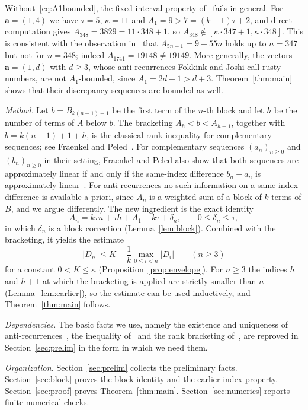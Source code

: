 \documentclass{amsart}
\theoremstyle{definition}
\theoremstyle{remark}
\numberwithin{equation}{section}
\numberwithin{table}{section}
\newcommand{\ba}{\mathbf{a}}
\begin{document}
Without~\eqref{eq:A1bounded}, the fixed-interval property of~\cite[Lemma~5]{FJ} fails in general. For $\ba=(1,4)$ we have $\tau=5$, $\kappa=11$ and $A_1=9>7=(k-1)\tau+2$, and direct computation gives $A_{348}=3829=11\cdot348+1$, so $A_{348}\notin[\kappa\cdot 347+1,\kappa\cdot348]$. This is consistent with the observation in~\cite[Section~5]{FJ} that $A_{5n+1}=9+55n$ holds up to $n=347$ but not for $n=348$; indeed $A_{1741}=19148\ne19149$. More generally, the vectors $\ba=(1,d)$ with $d\ge3$, whose anti-recurrences Fokkink and Joshi call rusty numbers, are not $A_1$-bounded, since $A_1=2d+1>d+3$. Theorem~\ref{thm:main} shows that their discrepancy sequences are bounded as well.

\emph{Method.} Let $b=B_{k(n-1)+1}$ be the first term of the $n$-th block and let $h$ be the number of terms of $A$ below $b$. The bracketing $A_h<b<A_{h+1}$, together with $b=k(n-1)+1+h$, is the classical rank inequality for complementary sequences; see Fraenkel and Peled~\cite[Theorem~3.2]{FP}. For complementary sequences $(a_n)_{n\ge0}$ and $(b_n)_{n\ge0}$ in their setting, Fraenkel and Peled also show that both sequences are approximately linear if and only if the same-index difference $b_n-a_n$ is approximately linear~\cite[Theorem~4.3]{FP}. For anti-recurrences no such information on a same-index difference is available a priori, since $A_n$ is a weighted sum of a block of $k$ terms of $B$, and we argue differently. The new ingredient is the exact identity
\[
A_n=k\tau n+\tau h+A_1-k\tau+\delta_n,\qquad 0\le\delta_n\le\tau,
\]
in which $\delta_n$ is a block correction (Lemma~\ref{lem:block}). Combined with the bracketing, it yields the estimate
\[
\lvert D_n\rvert\le K+\frac1k\max_{0\le i<n}\lvert D_i\rvert\qquad(n\ge3)
\]
for a constant $0<K\le\kappa$ (Proposition~\ref{prop:envelope}). For $n\ge3$ the indices $h$ and $h+1$ at which the bracketing is applied are strictly smaller than $n$ (Lemma~\ref{lem:earlier}), so the estimate can be used inductively, and Theorem~\ref{thm:main} follows.

\emph{Dependencies.} The basic facts we use, namely the existence and uniqueness of anti-recurrences~\cite[Lemma~2]{FJ}, the inequality of~\cite[Lemma~1]{FJ} and the rank bracketing of~\cite[Theorem~3.2]{FP}, are reproved in Section~\ref{sec:prelim} in the form in which we need them.

\emph{Organization.} Section~\ref{sec:prelim} collects the preliminary facts. Section~\ref{sec:block} proves the block identity and the earlier-index property. Section~\ref{sec:proof} proves Theorem~\ref{thm:main}. Section~\ref{sec:numerics} reports finite numerical checks.
\end{document}
